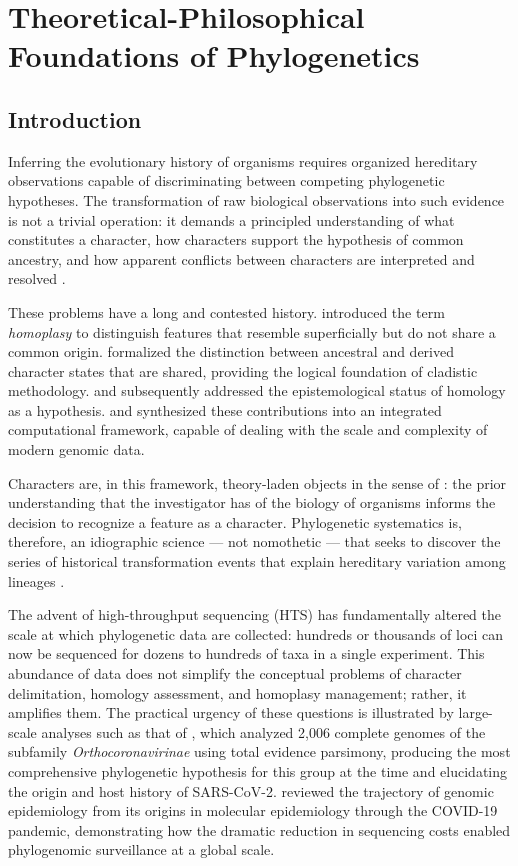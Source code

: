 \chapter{Theoretical-Philosophical Foundations of Phylogenetics}

\section{Introduction}

Inferring the evolutionary history of organisms requires organized hereditary observations capable of discriminating between competing phylogenetic hypotheses. The transformation of raw biological observations into such evidence is not a trivial operation: it demands a principled understanding of what constitutes a character, how characters support the hypothesis of common ancestry, and how apparent conflicts between characters are interpreted and resolved \parencite{wheeleretal2006}.

These problems have a long and contested history. \textcite{lankester1870} introduced the term \textit{homoplasy} to distinguish features that resemble superficially but do not share a common origin. \textcite{hennig1966} formalized the distinction between ancestral and derived character states that are shared, providing the logical foundation of cladistic methodology. \textcite{depinna1991} and \textcite{patterson1982} subsequently addressed the epistemological status of homology as a hypothesis. \textcite{wheeleretal2006} and \textcite{wheeler2012} synthesized these contributions into an integrated computational framework, capable of dealing with the scale and complexity of modern genomic data.

Characters are, in this framework, theory-laden objects in the sense of \textcite{popper1959}: the prior understanding that the investigator has of the biology of organisms informs the decision to recognize a feature as a character. Phylogenetic systematics is, therefore, an idiographic science --- not nomothetic --- that seeks to discover the series of historical transformation events that explain hereditary variation among lineages \parencite{grant2004ts}.

The advent of high-throughput sequencing (HTS) has fundamentally altered the scale at which phylogenetic data are collected: hundreds or thousands of loci can now be sequenced for dozens to hundreds of taxa in a single experiment. This abundance of data does not simplify the conceptual problems of character delimitation, homology assessment, and homoplasy management; rather, it amplifies them. The practical urgency of these questions is illustrated by large-scale analyses such as that of \textcite{jacobmachado2021a}, which analyzed 2,006 complete genomes of the subfamily \textit{Orthocoronavirinae} using total evidence parsimony, producing the most comprehensive phylogenetic hypothesis for this group at the time and elucidating the origin and host history of SARS-CoV-2. \textcite{jacobmachado2021b} reviewed the trajectory of genomic epidemiology from its origins in molecular epidemiology through the COVID-19 pandemic, demonstrating how the dramatic reduction in sequencing costs enabled phylogenomic surveillance at a global scale.

